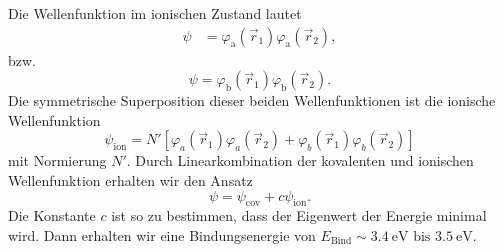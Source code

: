 	Die Wellenfunktion im ionischen Zustand lautet
	\begin{align}
		\label{eq:3.55}
		\psi&= \varphi_\text{a} \left( \vec{r}_{1} \right) \varphi_\text{a}\left( \vec{r}_{2} \right),
	\end{align}
	bzw.
	\begin{equation}
		\label{eq:3.56}
		\psi= \varphi_\text{b}\left( \vec{r}_{1} \right) \varphi_\text{b}\left( \vec{r}_{2} \right).
	\end{equation}
	Die symmetrische Superposition dieser beiden Wellenfunktionen ist die ionische Wellenfunktion
	\begin{equation}
		\psi_{\text{ion}} = N' \left[ \varphi_{a}\left( \vec{r}_{1} \right) \varphi_{a}\left( \vec{r}_{2} \right) + \varphi_{b} \left( \vec{r}_{1} \right) \varphi_{b} \left( \vec{r}_{2} \right)  \right] 
	\end{equation}
	mit Normierung $N'$.
	Durch Linearkombination der kovalenten und ionischen Wellenfunktion erhalten wir den Ansatz
	\begin{equation}
		\label{eq:3.58}
		\psi = \psi_{\text{cov}} + c \psi_{\text{ion}}.
	\end{equation}
	Die Konstante $c$ ist so zu bestimmen, dass der Eigenwert der Energie minimal wird.
	Dann erhalten wir eine Bindungsenergie von $E_\text{Bind}\sim\SI{3,4}{\electronvolt} \text{ bis } \SI{3,5}{\electronvolt}$.
